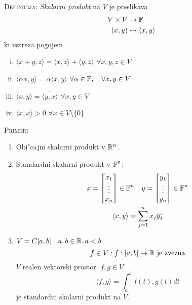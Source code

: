 \textsc{Definicija:} \emph{Skalarni produkt} na $V$ je preslikava
\begin{align*}
V \times V &\to \operatorname{\mathbb{F}} \\
(x, y) &\mapsto \langle x, y \rangle
\end{align*}
ki ustreza pogojem
\begin{enumerate}[(i)]
    \item $\langle x + y, z \rangle = \langle x, z \rangle + \langle y, z \rangle$ \hfill $\forall x, y, z \in V$
    \item $\langle \alpha x, y \rangle = \alpha \langle x, y \rangle$ \hfill $\forall \alpha \in \operatorname{\mathbb{F}}, \quad \forall x, y \in V$
    \item $\langle x, y \rangle = \overline{\langle y, x \rangle}$ \hfill $\forall x, y \in V$
    \item $\langle x, x \rangle > 0$ \hfill $\forall x \in V \setminus \{ 0 \}$
\end{enumerate}
\textsc{Primeri}
\begin{enumerate}
    \item Obi"cajni skalarni produkt v $\mathbb{R}^n$.
    \item Standardni skalarni produkt v $\operatorname{\mathbb{F}}^n$:
    \begin{gather*}
    \begin{aligned}
    x = \begin{bmatrix}
    x_1 \\ \vdots \\ x_n
    \end{bmatrix} \in \operatorname{\mathbb{F}}^n
    &&
    y = \begin{bmatrix}
    y_1 \\ \vdots \\ y_n
    \end{bmatrix} \in \operatorname{\mathbb{F}}^n
    \end{aligned} \\
    \langle x, y \rangle = \sum_{j = 1}^n x_j \overline{y_j}
    \end{gather*}
    
    \item $V = C[a, b] \quad a, b \in \mathbb{R}, a < b$
    \begin{equation*}
    f \in V: f: [a, b] \to \mathbb{R} \text{ je zvezna}
    \end{equation*}
    $V$ realen vektorski prostor. $f, g \in V$
    \begin{equation*}
    \langle f, g \rangle = \int_a^b f(t), g(t) dt
    \end{equation*}
    je standardni skalarni produkt na $V$.
\end{enumerate}
